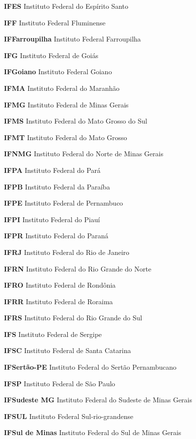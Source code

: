 \begin{siglas}
    \item[\textbf{IFES}] Instituto Federal do Espírito Santo
    \item[\textbf{IFF}] Instituto Federal Fluminense
    \item[\textbf{IFFarroupilha}] Instituto Federal Farroupilha
    \item[\textbf{IFG}] Instituto Federal de Goiás
    \item[\textbf{IFGoiano}] Instituto Federal Goiano
    \item[\textbf{IFMA}] Instituto Federal do Maranhão
    \item[\textbf{IFMG}] Instituto Federal de Minas Gerais
    \item[\textbf{IFMS}] Instituto Federal do Mato Grosso do Sul
    \item[\textbf{IFMT}] Instituto Federal do Mato Grosso
    \item[\textbf{IFNMG}] Instituto Federal do Norte de Minas Gerais
    \item[\textbf{IFPA}] Instituto Federal do Pará
    \item[\textbf{IFPB}] Instituto Federal da Paraíba
    \item[\textbf{IFPE}] Instituto Federal de Pernambuco
    \item[\textbf{IFPI}] Instituto Federal do Piauí
    \item[\textbf{IFPR}] Instituto Federal do Paraná
    \item[\textbf{IFRJ}] Instituto Federal do Rio de Janeiro
    \item[\textbf{IFRN}] Instituto Federal do Rio Grande do Norte
    \item[\textbf{IFRO}] Instituto Federal de Rondônia
    \item[\textbf{IFRR}] Instituto Federal de Roraima
    \item[\textbf{IFRS}] Instituto Federal do Rio Grande do Sul
    \item[\textbf{IFS}] Instituto Federal de Sergipe
    \item[\textbf{IFSC}] Instituto Federal de Santa Catarina
    \item[\textbf{IFSertão-PE}] Instituto Federal do Sertão Pernambucano
    \item[\textbf{IFSP}] Instituto Federal de São Paulo
    \item[\textbf{IFSudeste MG}] Instituto Federal do Sudeste de Minas Gerais
    \item[\textbf{IFSUL}] Instituto Federal Sul-rio-grandense
    \item[\textbf{IFSul de Minas}] Instituto Federal do Sul de Minas Gerais

\end{siglas}
